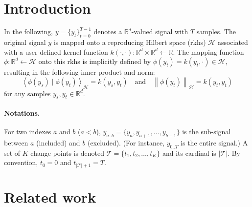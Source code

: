 \documentclass[12pt]{article}
\newcommand\RR{\mathbb{R}}
\newcommand\HH{\mathcal{H}}
\newcommand{\norm}[1]{\left\lVert#1\right\rVert}
\newcommand{\sca}[2]{\left\langle#1\mid #2\right\rangle}
\newcommand{\TT}{\mathcal{T}}
\begin{document}
\maketitle

\section{Introduction}
In the following, $y=\{y_t\}_{t=0}^{T-1}$ denotes a $\RR^d$-valued signal with $T$ samples.
The original signal $y$ is mapped onto a reproducing Hilbert space (rkhs) $\HH$ associated with a user-defined kernel function $k(\cdot, \cdot):\RR^d\times\RR^d \leftarrow \RR$.
The mapping function $\phi:\RR^d \leftarrow\HH$ onto this rkhs is implicitly defined by $\phi(y_t)=k(y_t, \cdot)\in\HH$, resulting in the following inner-product and norm:
\begin{equation}
    \sca{\phi(y_s)}{\phi(y_t)}_\HH = k(y_s, y_t) \quad\text{and}\quad \norm{\phi(y_t)}_\HH = k(y_t, y_t)
\end{equation}
for any samples $y_s, y_t\in\RR^d$.

\paragraph{Notations.}
For two indexes $a$ and $b$ ($a<b$), $y_{a..b} = \{y_a,y_{a+1},\dots,y_{b-1}\}$ is the sub-signal between $a$ (included) and $b$ (excluded).
(For instance, $y_{0..T}$ is the entire signal.)
A set of $K$ change points is denoted $\TT=\{t_1,t_2,\dots,t_K\}$ and its cardinal is $|\TT|$.
By convention, $t_0=0$ and $t_{|\TT|+1}=T$.

\section{Related work}

\cite{Celisse2017}
\end{document}
